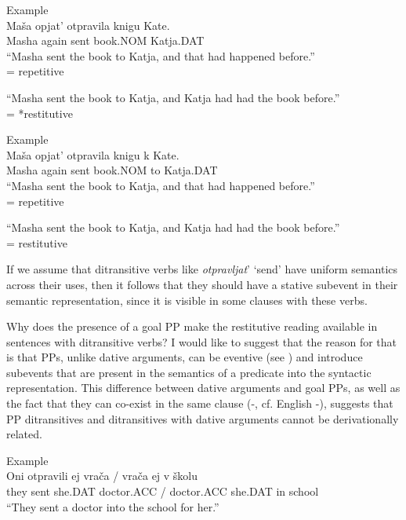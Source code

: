 \documentclass[output=paper,modfonts,nonflat,
 hidelinks
]{langsci/langscibook}
\begin{document}
 \ea\label{ex:bondarenko:}
{Example}\\

\gll Maša opjat’ otpravila knigu Kate.\\
     Masha again sent book.NOM Katja.DAT\\
\ea “Masha sent the book to Katja, and that had happened before.”\\
= {repetitive}

\ex *“Masha sent the book to Katja, and Katja had had the book   before.”\\
= *{restitutive}
\z
\z

 \ea\label{ex:bondarenko:}
{Example}\\

\gll Maša opjat’ otpravila knigu k Kate.\\
     Masha again sent book.NOM to Katja.DAT\\
\ea “Masha sent the book to Katja, and that had happened before.”\\
  = {repetitive}

\ex “Masha sent the book to Katja, and Katja had had the book   before.”\\
 
 = restitutive
\z
\z


If we assume that ditransitive verbs like \textit{otpravljat}’ ‘send’ have uniform semantics across their uses, then it follows that they should have a stative subevent in their semantic representation, since it is visible in some clauses with these verbs.



Why does the presence of a goal PP make the restitutive reading available in sentences with ditransitive verbs? I would like to suggest that the reason for that is that PPs, unlike dative arguments, can be eventive (see \citep{McIntyre2006}) and introduce subevents that are present in the semantics of a predicate into the syntactic representation. This difference between dative arguments and goal PPs, as well as the fact that they can co-exist in the same clause (-, cf. English -), suggests that PP ditransitives and ditransitives with dative arguments cannot be derivationally related.


 \ea\label{ex:bondarenko:}
{Example}\\

\gll Oni otpravili ej vrača / vrača ej v školu\\
     they sent she.DAT doctor.ACC / doctor.ACC she.DAT in school\\
\glt “They sent a doctor into the school for her.”
\z
\end{document}
